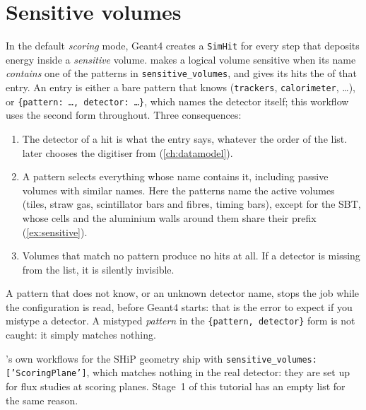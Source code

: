 \section{Sensitive volumes}
\label{sec:sensitive}

In the default \emph{scoring} mode, Geant4 creates a \texttt{SimHit} for every
step that deposits energy inside a \emph{sensitive} volume.  makes
a logical volume sensitive when its name \emph{contains} one of the patterns
in \texttt{sensitive\_volumes}, and gives its hits the  of
that entry. An entry is either a bare pattern that  knows
(\texttt{trackers}, \texttt{calorimeter}, \ldots), or
\texttt{\{pattern: \ldots, detector: \ldots\}}, which names the detector
itself; this workflow uses the second form throughout. Three consequences:

\begin{enumerate}
  \item The detector of a hit is what the entry says, whatever the order of
        the list.  later chooses the digitiser from
         (\cref{ch:datamodel}).
  \item A pattern selects everything whose name contains it, including
        passive volumes with similar names. Here the patterns name the active
        volumes (tiles, straw gas, scintillator bars and fibres, timing bars),
        except for the SBT, whose cells and the aluminium walls around them
        share their prefix (\cref{ex:sensitive}).
  \item Volumes that match no pattern produce no hits at all. If a detector is
        missing from the list, it is silently invisible.
\end{enumerate}

\begin{pitfall}
A pattern that  does not know, or an unknown detector name, stops
the job while the configuration is read, before Geant4 starts: that is the
error to expect if you mistype a detector. A mistyped \emph{pattern} in the
\texttt{\{pattern, detector\}} form is not caught: it simply matches nothing.
\end{pitfall}

\begin{note}
's own workflows for the SHiP geometry ship with
\texttt{sensitive\_volumes: ['ScoringPlane']}, which matches nothing in the
real detector: they are set up for flux studies at scoring planes. Stage~1 of
this tutorial has an empty list for the same reason.
\end{note}


